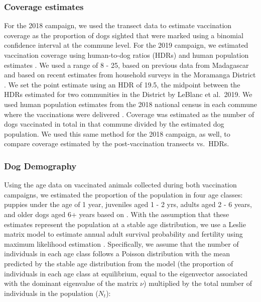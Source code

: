 \documentclass[tropicalmed,article,submit,moreauthors,pdftex]{mdpi}
\begin{document}
\hypertarget{coverage-estimates}{%
\subsubsection{Coverage estimates}\label{coverage-estimates}}

For the 2018 campaign, we used the transect data to estimate vaccination
coverage as the proportion of dogs sighted that were marked using a
binomial confidence interval at the commune level. For the 2019
campaign, we estimated vaccination coverage using human-to-dog ratios
(HDRs) and human population estimates
\citep{cleaveland2003, athingo2020}. We used a range of 8 - 25, based on
previous data from Madagascar \citep{ratsitorahina2009} and based on
recent estimates from household surveys in the Moramanga District
\citep{leblancclaireRabiesMadagascarThreepronged2019}. We set the point
estimate using an HDR of 19.5, the midpoint between the HDRs estimated
for two communities in the District by LeBlanc et al.~2019. We used
human population estimates from the 2018 national census in each commune
where the vaccinations were delivered \citep{instat2021}. Coverage was
estimated as the number of dogs vaccinated in total in that commune
divided by the estimated dog population. We used this same method for
the 2018 campaign, as well, to compare coverage estimated by the
post-vaccination transects vs.~HDRs.

\hypertarget{dog-demography}{%
\subsubsection{Dog Demography}\label{dog-demography}}

Using the age data on vaccinated animals collected during both
vaccination campaigns, we estimated the proportion of the population in
four age classes: puppies under the age of 1 year, juveniles aged 1 - 2
yrs, adults aged 2 - 6 years, and older dogs aged 6+ years based on .
With the assumption that these estimates represent the population at a
stable age distribution, we use a Leslie matrix model to estimate annual
adult survival probability and fertility using maximum likelihood
estimation \citep{Fujiwara2017}. Specifically, we assume that the number
of individuals in each age class follows a Poisson distribution with the
mean predicted by the stable age distribution from the model (the
proportion of individuals in each age class at equilibrium, equal to the
eigenvector associated with the dominant eigenvalue of the matrix
\(\nu\)) multiplied by the total number of individuals in the population
(\(N_t\)):
\end{document}

